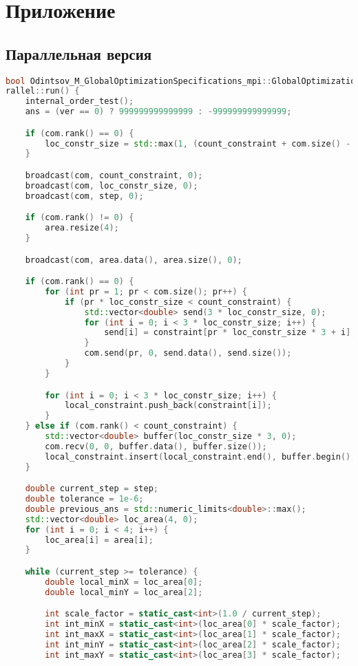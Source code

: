 \documentclass[a4paper,12pt]{article}
\begin{document}
\newpage
\section*{Приложение}
\subsection*{Параллельная версия}
\begin{lstlisting}[language=C++, caption=Код параллельной версии]
bool Odintsov_M_GlobalOptimizationSpecifications_mpi::GlobalOptimizationSpecificationsMPIPa
rallel::run() {
    internal_order_test();
    ans = (ver == 0) ? 999999999999999 : -999999999999999;

    if (com.rank() == 0) {
        loc_constr_size = std::max(1, (count_constraint + com.size() - 1) / com.size());
    }

    broadcast(com, count_constraint, 0);
    broadcast(com, loc_constr_size, 0);
    broadcast(com, step, 0);

    if (com.rank() != 0) {
        area.resize(4);
    }

    broadcast(com, area.data(), area.size(), 0);

    if (com.rank() == 0) {
        for (int pr = 1; pr < com.size(); pr++) {
            if (pr * loc_constr_size < count_constraint) {
                std::vector<double> send(3 * loc_constr_size, 0);
                for (int i = 0; i < 3 * loc_constr_size; i++) {
                    send[i] = constraint[pr * loc_constr_size * 3 + i];
                }
                com.send(pr, 0, send.data(), send.size());
            }
        }

        for (int i = 0; i < 3 * loc_constr_size; i++) {
            local_constraint.push_back(constraint[i]);
        }
    } else if (com.rank() < count_constraint) {
        std::vector<double> buffer(loc_constr_size * 3, 0);
        com.recv(0, 0, buffer.data(), buffer.size());
        local_constraint.insert(local_constraint.end(), buffer.begin(), buffer.end());
    }

    double current_step = step;
    double tolerance = 1e-6;
    double previous_ans = std::numeric_limits<double>::max();
    std::vector<double> loc_area(4, 0);
    for (int i = 0; i < 4; i++) {
        loc_area[i] = area[i];
    }

    while (current_step >= tolerance) {
        double local_minX = loc_area[0];
        double local_minY = loc_area[2];

        int scale_factor = static_cast<int>(1.0 / current_step);
        int int_minX = static_cast<int>(loc_area[0] * scale_factor);
        int int_maxX = static_cast<int>(loc_area[1] * scale_factor);
        int int_minY = static_cast<int>(loc_area[2] * scale_factor);
        int int_maxY = static_cast<int>(loc_area[3] * scale_factor);


\end{lstlisting}
\end{document}
